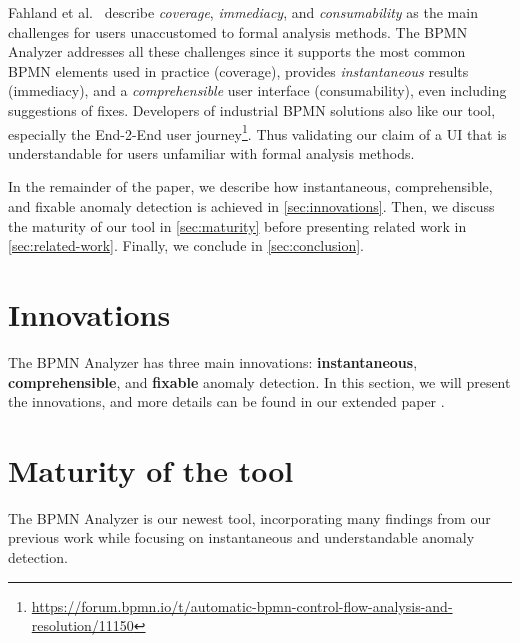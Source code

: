 \documentclass[
]{ceurart}
\begin{document}
Fahland et al.~\cite{fahlandAnalysisDemandInstantaneous2011} describe \textit{coverage}, \textit{immediacy}, and \textit{consumability} as the main challenges for users unaccustomed to formal analysis methods.
The BPMN Analyzer addresses all these challenges since it supports the most common BPMN elements used in practice (coverage), provides \textit{instantaneous} results (immediacy), and a \textit{comprehensible} user interface (consumability), even including suggestions of fixes.
Developers of industrial BPMN solutions also like our tool, especially the End-2-End user journey\footnote{\url{https://forum.bpmn.io/t/automatic-bpmn-control-flow-analysis-and-resolution/11150}}.
Thus validating our claim of a UI that is understandable for users unfamiliar with formal analysis methods.

In the remainder of the paper, we describe how instantaneous, comprehensible, and fixable anomaly detection is achieved in \autoref{sec:innovations}.
Then, we discuss the maturity of our tool in \autoref{sec:maturity} before presenting related work in \autoref{sec:related-work}.
Finally, we conclude in \autoref{sec:conclusion}.

\section{Innovations} \label{sec:innovations} %
The BPMN Analyzer has three main innovations: \textbf{instantaneous}, \textbf{comprehensible}, and \textbf{fixable} anomaly detection.
In this section, we will present the innovations, and more details can be found in our extended paper \cite{krauterInstantaneousComprehensibleFixable2024}.

\section{Maturity of the tool} \label{sec:maturity}
The BPMN Analyzer is our newest tool, incorporating many findings from our previous work \cite{krauterFormalizationAnalysisBPMN2023} while focusing on instantaneous and understandable anomaly detection.
\end{document}

